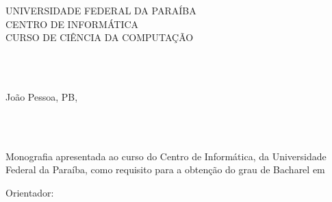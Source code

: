 \documentclass{tcc}
\begin{document}
\pagestyle{empty} %


\begin{center}

UNIVERSIDADE FEDERAL DA PARAÍBA \\
CENTRO DE INFORMÁTICA \\
CURSO DE CIÊNCIA DA COMPUTAÇÃO \\

\end{center}

\vspace{3cm}

\begin{center}
\large\theauthor
\end{center}

\vspace{4cm}



\begin{center}

\Large{\bf \thetitle}\\
\Large{\subtitulo}\\

\end{center}

\vfill

\begin{center}
João Pessoa, PB, \the\year
\end{center}

\newpage
\setcounter{page}{1}
\begin{center}
\theauthor
\end{center}
\vspace{3in}
\begin{center}
\Large{{\bf\thetitle} \\\subtitulo}\\
\end{center}

\vspace{2in}

    {
      \hspace{.35\textwidth}
      \begin{minipage}{.55\textwidth}
        \normalsize
        Monografia apresentada ao curso \nomedocurso  do Centro de Informática, da Universidade Federal da Paraíba, como requisito para a obtenção do grau de Bacharel em \titulobar

        \vspace{0.5cm}
        Orientador: \orientador
      \end{minipage}%
      \vspace*{\fill}
    }%
\end{document}
